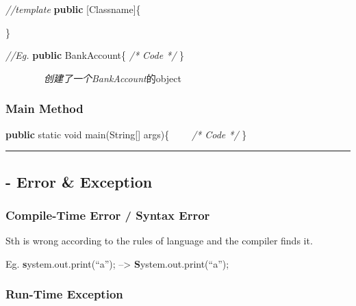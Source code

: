 \documentclass[
  paper=a4,
  ,captions=tableheading
]{scrartcl}
\newenvironment{Shaded}{}{}
\newcommand{\BuiltInTok}[1]{#1}
\newcommand{\CommentTok}[1]{\textcolor[rgb]{0.38,0.63,0.69}{\textit{#1}}}
\newcommand{\DataTypeTok}[1]{\textcolor[rgb]{0.56,0.13,0.00}{#1}}
\newcommand{\FunctionTok}[1]{\textcolor[rgb]{0.02,0.16,0.49}{#1}}
\newcommand{\KeywordTok}[1]{\textcolor[rgb]{0.00,0.44,0.13}{\textbf{#1}}}
\newcommand{\NormalTok}[1]{#1}
\begin{document}
\begin{Shaded}
\begin{Highlighting}[]
\CommentTok{//template}
\KeywordTok{public}\NormalTok{ [Classname]\{}

\NormalTok{\}}

\CommentTok{//Eg.}
\KeywordTok{public}\NormalTok{ BankAccount\{}
    \CommentTok{/* Code */}
\NormalTok{\}}
\end{Highlighting}
\end{Shaded}

~~~~~~~~\emph{创建了一个BankAccount}的object

\hypertarget{main-method}{%
\subsubsection{Main Method}\label{main-method}}

\begin{Shaded}
\begin{Highlighting}[]
\KeywordTok{public} \DataTypeTok{static} \DataTypeTok{void} \FunctionTok{main}\NormalTok{(}\BuiltInTok{String}\NormalTok{[] args)\{}
    \CommentTok{/* Code */}
\NormalTok{\}}
\end{Highlighting}
\end{Shaded}

\begin{center}\rule{0.5\linewidth}{\linethickness}\end{center}

\hypertarget{error-exception}{%
\subsection{- Error \& Exception}\label{error-exception}}

\hypertarget{compile-time-error-syntax-error}{%
\subsubsection{Compile-Time Error / Syntax
Error}\label{compile-time-error-syntax-error}}

Sth is wrong according to the rules of language and the compiler finds
it.

Eg. \textbf{s}ystem.out.print(\enquote{a}); --\textgreater{}
\textbf{S}ystem.out.print(\enquote{a});

\hypertarget{run-time-exception}{%
\subsubsection{Run-Time Exception}\label{run-time-exception}}
\end{document}
